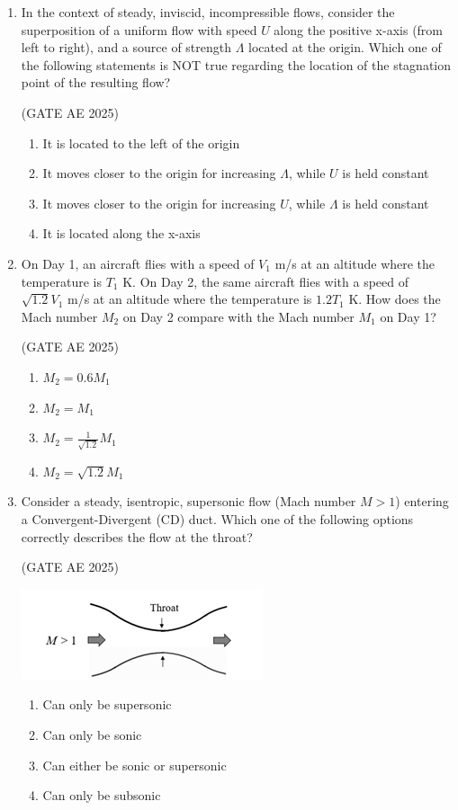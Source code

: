 \documentclass[journal,12pt,onecolumn]{IEEEtran}
\theoremstyle{remark}
\begin{document}
\begin{flushleft}
\begin{enumerate}
\item In the context of steady, inviscid, incompressible flows, consider the superposition of a uniform flow with speed $U$ along the positive x-axis (from left to right), and a source of strength $\Lambda$ located at the origin. Which one of the following statements is NOT true regarding the location of the stagnation point of the resulting flow?

\hfill (GATE AE 2025)

\begin{enumerate}
     \item It is located to the left of the origin
    \item It moves closer to the origin for increasing $\Lambda$, while $U$ is held constant
    \item It moves closer to the origin for increasing $U$, while $\Lambda$ is held constant
    \item It is located along the x-axis
\end{enumerate}

\item  On Day 1, an aircraft flies with a speed of $V_1$ m/s at an altitude where the temperature is $T_1$ K. On Day 2, the same aircraft flies with a speed of $\sqrt{1.2}V_1$ m/s at an altitude where the temperature is $1.2T_1$ K. How does the Mach number $M_2$ on Day 2 compare with the Mach number $M_1$ on Day 1?

\hfill (GATE AE 2025)

\begin{enumerate}
    \item $M_2 = 0.6 M_1$
    \item $M_2 = M_1$
    \item $M_2 = \frac{1}{\sqrt{1.2}} M_1$
    \item $M_2 = \sqrt{1.2} M_1$
\end{enumerate}
    
\item Consider a steady, isentropic, supersonic flow (Mach number $M > 1$) entering a Convergent-Divergent (CD) duct. Which one of the following options correctly describes the flow at the throat?

\hfill (GATE AE 2025)

\begin{center}
\includegraphics[width=0.5\columnwidth]{figs/throat.png}
\end{center}
\begin{enumerate}
    \item Can only be supersonic
    \item Can only be sonic
    \item Can either be sonic or supersonic
    \item Can only be subsonic
\end{enumerate}


\end{enumerate}
\end{flushleft}
\end{document}

